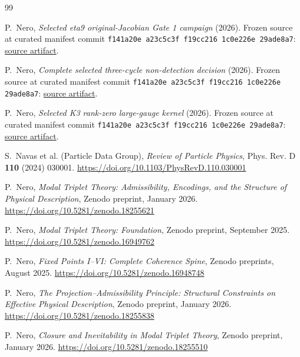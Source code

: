 \documentclass[11pt]{article}
\begin{document}
\begin{thebibliography}{99}

P.~Nero, \emph{Selected eta9 original-Jacobian Gate 1 campaign} (2026).
Frozen source at curated manifest commit
\texttt{f141a20e a23c5c3f f19cc216 1c0e226e 29ade8a7}:
\href{https://github.com/PeterNero/mtt-results-repro/blob/f141a20ea23c5c3ff19cc2161c0e226e29ade8a7/release/results/eta9_gate1_campaign/artifact.json}{source artifact}.

P.~Nero, \emph{Complete selected three-cycle non-detection decision} (2026).
Frozen source at curated manifest commit
\texttt{f141a20e a23c5c3f f19cc216 1c0e226e 29ade8a7}:
\href{https://github.com/PeterNero/mtt-results-repro/blob/f141a20ea23c5c3ff19cc2161c0e226e29ade8a7/release/results/eta9_three_cycle_b96_nondetection/artifact.json}{source artifact}.

P.~Nero, \emph{Selected K3 rank-zero large-gauge kernel} (2026).
Frozen source at curated manifest commit
\texttt{f141a20e a23c5c3f f19cc216 1c0e226e 29ade8a7}:
\href{https://github.com/PeterNero/mtt-results-repro/blob/f141a20ea23c5c3ff19cc2161c0e226e29ade8a7/release/results/q79_bk3_rank_zero_kernel/artifact.json}{source artifact}.

S.~Navas et al. (Particle Data Group),
\emph{Review of Particle Physics},
Phys. Rev. D \textbf{110} (2024) 030001.
\url{https://doi.org/10.1103/PhysRevD.110.030001}

P.~Nero,
\emph{Modal Triplet Theory: Admissibility, Encodings, and the Structure of Physical Description},
Zenodo preprint, January 2026.
\url{https://doi.org/10.5281/zenodo.18255621}

P.~Nero,
\emph{Modal Triplet Theory: Foundation},
Zenodo preprint, September 2025.
\url{https://doi.org/10.5281/zenodo.16949762}

P.~Nero,
\emph{Fixed Points I--VI: Complete Coherence Spine},
Zenodo preprints, August 2025.
\url{https://doi.org/10.5281/zenodo.16948748}

P.~Nero,
\emph{The Projection--Admissibility Principle: Structural Constraints on Effective Physical Description},
Zenodo preprint, January 2026.
\url{https://doi.org/10.5281/zenodo.18255838}

P.~Nero,
\emph{Closure and Inevitability in Modal Triplet Theory},
Zenodo preprint, January 2026.
\url{https://doi.org/10.5281/zenodo.18255510}


\end{thebibliography}
\end{document}
